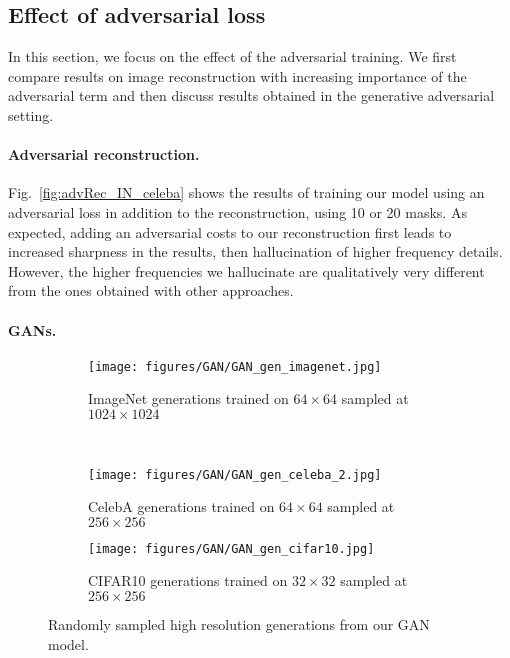 \documentclass[10pt,twocolumn,letterpaper]{article}
\begin{document}
\subsection{Effect of adversarial loss}

In this section, we focus on the effect of the adversarial training. We first compare results on image reconstruction with increasing importance of the adversarial term and then discuss results obtained in the generative adversarial setting. 

\paragraph{Adversarial reconstruction.}

Fig.~\ref{fig:advRec_IN_celeba} shows the results of training our model using an adversarial loss in addition to the reconstruction, using 10 or 20 masks. As expected, adding an adversarial costs to our reconstruction first leads to increased sharpness in the results, then hallucination of higher frequency details. However, the higher frequencies we hallucinate are qualitatively very different from the ones obtained with other approaches.

\paragraph{GANs.}

\begin{figure*}[h!]
	\centering
	\begin{subfigure}{\textwidth}
		\texttt{[image: figures/GAN/GAN\_gen\_imagenet.jpg]}
		\caption{ImageNet generations trained on $64\times64$ sampled at $1024\times1024$}
	\end{subfigure}\\
	\begin{subfigure}{0.48\textwidth}
		\texttt{[image: figures/GAN/GAN\_gen\_celeba\_2.jpg]}
		\caption{CelebA generations trained on $64\times64$ sampled at $256\times256$}
	\end{subfigure}\hfill
	\begin{subfigure}{0.48\textwidth}
		\texttt{[image: figures/GAN/GAN\_gen\_cifar10.jpg]}
		\caption{CIFAR10 generations trained on $32\times32$ sampled at $256\times256$}
	\end{subfigure}
	\caption{Randomly sampled high resolution generations from our GAN model.}
	\label{fig:GAN_generations}
\end{figure*}
\end{document}
